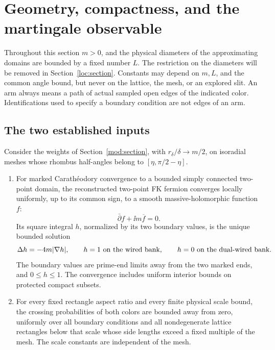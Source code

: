 \section{Geometry, compactness, and the martingale observable}
\label{geo:section}
\label{sec:geometry}

Throughout this section \(m>0\), and the physical diameters of the
approximating domains are bounded by a fixed number \(L\).
The restriction on the diameters will be removed in
Section~\ref{loc:section}. Constants may depend on \(m,L\), and the common
angle bound, but never on the lattice, the mesh, or an explored slit.
An arm always means a path of actual sampled open edges of the indicated
color. Identifications used to specify a boundary condition are not edges
of an arm.

\subsection{The two established inputs}

\begin{proposition}
\label{prop:inputs}
Consider the weights of Section~\ref{mod:section}, with
\(r_\delta/\delta\to m/2\), on isoradial meshes whose rhombus half-angles
belong to \([\eta,\pi/2-\eta]\).
\begin{enumerate}
\item
For marked Carath\'eodory convergence to a bounded simply connected
two-point domain, the reconstructed two-point FK fermion converges
locally uniformly, up to its common sign, to a smooth massive-holomorphic
function \(f\):
\[
 \bar\partial f+\ii m\overline f=0.
\]
Its square integral \(h\), normalized by its two boundary values, is the
unique bounded solution
\[
 \Delta h=-4m|\nabla h|,\qquad
 h=1\ \hbox{on the wired bank},\qquad
 h=0\ \hbox{on the dual-wired bank}.
\]
The boundary values are prime-end limits away from the two marked ends,
and \(0\le h\le1\). The convergence includes uniform interior bounds
on protected compact subsets.
\item
For every fixed rectangle aspect ratio and every finite physical scale
bound, the crossing probabilities of both colors are bounded away from
zero, uniformly over all boundary conditions and all nondegenerate
lattice rectangles below that scale whose side lengths exceed a fixed
multiple of the mesh. The scale constants are independent of the mesh.
\end{enumerate}
\end{proposition}

